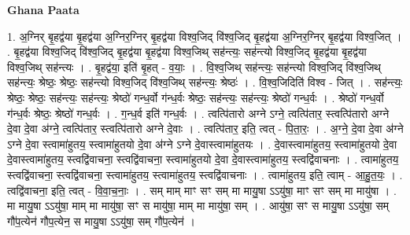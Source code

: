 \documentclass[17pt]{extarticle}
\begin{document}
\textbf{Ghana Paata } \newline

1. अ॒ग्निर् बृ॒हद्व॑या बृ॒हद्व॑या अ॒ग्निर॒ग्निर् बृ॒हद्व॑या विश्व॒जिद् वि॑श्व॒जिद् बृ॒हद्व॑या अ॒ग्निर॒ग्निर् बृ॒हद्व॑या विश्व॒जित् । . बृ॒हद्व॑या विश्व॒जिद् वि॑श्व॒जिद् बृ॒हद्व॑या बृ॒हद्व॑या विश्व॒जिथ् सह॑न्त्यः॒ सह॑न्त्यो विश्व॒जिद् बृ॒हद्व॑या बृ॒हद्व॑या विश्व॒जिथ् सह॑न्त्यः । . बृ॒हद्व॑या॒ इति॑ बृ॒हत् - व॒याः॒ । . वि॒श्व॒जिथ् सह॑न्त्यः॒ सह॑न्त्यो विश्व॒जिद् वि॑श्व॒जिथ् सह॑न्त्यः॒ श्रेष्ठः॒ श्रेष्ठः॒ सह॑न्त्यो विश्व॒जिद् वि॑श्व॒जिथ् सह॑न्त्यः॒ श्रेष्ठः॑ । . वि॒श्व॒जिदिति॑ विश्व - जित् । . सह॑न्त्यः॒ श्रेष्ठः॒ श्रेष्ठः॒ सह॑न्त्यः॒ सह॑न्त्यः॒ श्रेष्ठो॑ गन्ध॒र्वो ग॑न्ध॒र्वः श्रेष्ठः॒ सह॑न्त्यः॒ सह॑न्त्यः॒ श्रेष्ठो॑ गन्ध॒र्वः । . श्रेष्ठो॑ गन्ध॒र्वो ग॑न्ध॒र्वः श्रेष्ठः॒ श्रेष्ठो॑ गन्ध॒र्वः । . ग॒न्ध॒र्व इति॑ गन्ध॒र्वः । . त्वत्पि॑तारो अग्ने ऽग्ने॒ त्वत्पि॑तार॒ स्त्वत्पि॑तारो अग्ने दे॒वा दे॒वा अ॑ग्ने॒ त्वत्पि॑तार॒ स्त्वत्पि॑तारो अग्ने दे॒वाः । . त्वत्पि॑तार॒ इति॒ त्वत् - पि॒ता॒रः॒ । . अ॒ग्ने॒ दे॒वा दे॒वा अ॑ग्ने ऽग्ने दे॒वा स्त्वामा॑हुतय॒ स्त्वामा॑हुतयो दे॒वा अ॑ग्ने ऽग्ने दे॒वास्त्वामा॑हुतयः । . दे॒वास्त्वामा॑हुतय॒ स्त्वामा॑हुतयो दे॒वा दे॒वास्त्वामा॑हुतय॒ स्त्वद्वि॑वाचना॒ स्त्वद्वि॑वाचना॒ स्त्वामा॑हुतयो दे॒वा दे॒वास्त्वामा॑हुतय॒ स्त्वद्वि॑वाचनाः । . त्वामा॑हुतय॒ स्त्वद्वि॑वाचना॒ स्त्वद्वि॑वाचना॒ स्त्वामा॑हुतय॒ स्त्वामा॑हुतय॒ स्त्वद्वि॑वाचनाः । . त्वामा॑हुतय॒ इति॒ त्वाम् - आ॒हु॒त॒यः॒ । . त्वद्वि॑वाचना॒ इति॒ त्वत् - वि॒वा॒च॒नाः॒ । . सम् माम् माꣳ सꣳ सम् मा मायु॒षा ऽऽयु॑षा॒ माꣳ सꣳ सम् मा मायु॑षा । . मा मायु॒षा ऽऽयु॑षा॒ माम् मा मायु॑षा॒ सꣳ स मायु॑षा॒ माम् मा मायु॑षा॒ सम् । . आयु॑षा॒ सꣳ स मायु॒षा ऽऽयु॑षा॒ सम् गौ॑प॒त्येन॑ गौप॒त्येन॒ स मायु॒षा ऽऽयु॑षा॒ सम् गौ॑प॒त्येन॑ । \newline
\end{document}
